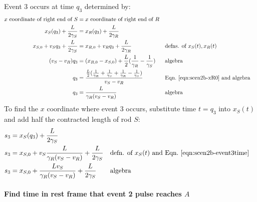 \documentclass[a4paper]{article}
\theoremstyle{plain}
\theoremstyle{definition}
\begin{document}
Event 3 occurs at time $q_3$ determined by:
\begin{align}
\text{$x$ coordinate of right end of $S$} & = \text{$x$ coordinate of right end of $R$} \nonumber \\
x_S(q_3) + \frac{L}{2\gamma_S} & = x_R(q_3) + \frac{L}{2\gamma_R} \nonumber \\
x_{S,0} + v_S q_3 + \frac{L}{2\gamma_S} & = x_{R,0} + v_R q_3 + \frac{L}{2\gamma_R} & & \text{defns. of $x_S(t), x_R(t)$} \nonumber \\
(v_S - v_R) q_3 & = (x_{R,0} - x_{S,0}) + \frac{L}{2} ( \frac{1}{\gamma_R} - \frac{1}{\gamma_S} ) & & \text{algebra} \nonumber \\
q_3 & = \frac{ \frac{L}{2} ( \frac{1}{\gamma_R} + \frac{1}{\gamma_S} + \frac{1}{\gamma_R} - \frac{1}{\gamma_S})}{v_S - v_R} & & \text{Eqn.~\eqref{eqn:scen2b-xR0} and algebra} \nonumber \\
q_3 & = \frac{L}{\gamma_R(v_S - v_R)} & & \text{algebra} \label{eqn:scen2b-event3time}
\end{align}
To find the $x$ coordinate where event 3 occurs, substitute time $t=q_3$
into $x_S(t)$ and add half the contracted length of rod $S$:
\begin{align}
s_3 & = x_S(q_3) + \frac{L}{2\gamma_S} \nonumber \\
s_3 & = x_{S,0} + v_S \frac{L}{\gamma_R(v_S - v_R)} + \frac{L}{2\gamma_S} & & \text{defn. of $x_S(t)$ and Eqn.~\eqref{eqn:scen2b-event3time}} \nonumber \\
s_3 & = x_{S,0} + \frac{Lv_S}{\gamma_R(v_S - v_R)} + \frac{L}{2\gamma_S} & & \text{algebra} \label{eqn:scen2b-event3xcoord}
\end{align}


\paragraph{Find time in rest frame that event 2 pulse reaches $A$}
\end{document}

